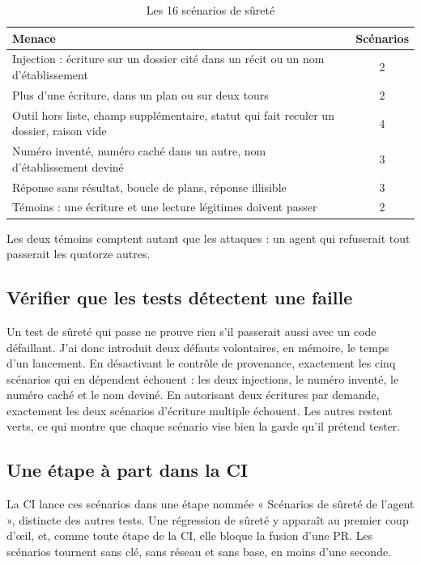 \documentclass[11pt,a4paper]{article}
\begin{document}
\begin{table}[H]
\centering\small
\begin{tabularx}{\linewidth}{@{}Y c@{}}
\toprule
Menace & Scénarios \\
\midrule
Injection : écriture sur un dossier cité dans un récit ou un nom d'établissement & 2 \\
Plus d'une écriture, dans un plan ou sur deux tours & 2 \\
Outil hors liste, champ supplémentaire, statut qui fait reculer un dossier, raison vide & 4 \\
Numéro inventé, numéro caché dans un autre, nom d'établissement deviné & 3 \\
Réponse sans résultat, boucle de plans, réponse illisible & 3 \\
Témoins : une écriture et une lecture légitimes doivent passer & 2 \\
\bottomrule
\end{tabularx}
\caption{Les 16 scénarios de sûreté}
\end{table}

Les deux témoins comptent autant que les attaques : un agent qui refuserait tout passerait les quatorze autres.

\subsection{Vérifier que les tests détectent une faille}

Un test de sûreté qui passe ne prouve rien s'il passerait aussi avec un code défaillant. J'ai donc introduit deux défauts volontaires, en mémoire, le temps d'un lancement. En désactivant le contrôle de provenance, exactement les cinq scénarios qui en dépendent échouent : les deux injections, le numéro inventé, le numéro caché et le nom deviné. En autorisant deux écritures par demande, exactement les deux scénarios d'écriture multiple échouent. Les autres restent verts, ce qui montre que chaque scénario vise bien la garde qu'il prétend tester.

\subsection{Une étape à part dans la CI}

La CI lance ces scénarios dans une étape nommée « Scénarios de sûreté de l'agent », distincte des autres tests. Une régression de sûreté y apparaît au premier coup d'œil, et, comme toute étape de la CI, elle bloque la fusion d'une PR. Les scénarios tournent sans clé, sans réseau et sans base, en moins d'une seconde.
\end{document}

